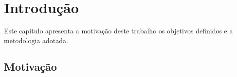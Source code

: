 \chapter[Introdução]{Introdução}
\par Este capítulo apresenta a motivação deste trabalho os objetivos definidos e a metodologia adotada.

\section{Motivação}

